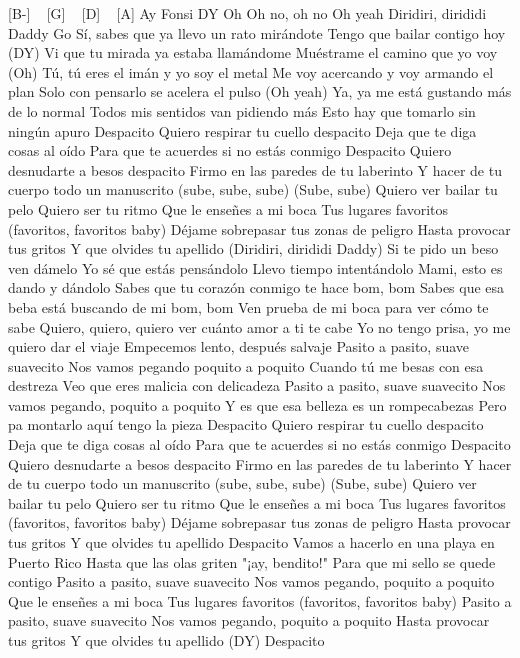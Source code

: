 
[B-] ~ [G] ~ [D] ~ [A]
Ay
Fonsi
DY
Oh
Oh no, oh no
Oh yeah
Diridiri, dirididi Daddy
Go
Sí, sabes que ya llevo un rato mirándote
Tengo que bailar contigo hoy (DY)
Vi que tu mirada ya estaba llamándome
Muéstrame el camino que yo voy (Oh)
Tú, tú eres el imán y yo soy el metal
Me voy acercando y voy armando el plan
Solo con pensarlo se acelera el pulso (Oh yeah)
Ya, ya me está gustando más de lo normal
Todos mis sentidos van pidiendo más
Esto hay que tomarlo sin ningún apuro
Despacito
Quiero respirar tu cuello despacito
Deja que te diga cosas al oído
Para que te acuerdes si no estás conmigo
Despacito
Quiero desnudarte a besos despacito
Firmo en las paredes de tu laberinto
Y hacer de tu cuerpo todo un manuscrito (sube, sube, sube)
(Sube, sube)
Quiero ver bailar tu pelo
Quiero ser tu ritmo
Que le enseñes a mi boca
Tus lugares favoritos (favoritos, favoritos baby)
Déjame sobrepasar tus zonas de peligro
Hasta provocar tus gritos
Y que olvides tu apellido (Diridiri, dirididi Daddy)
Si te pido un beso ven dámelo
Yo sé que estás pensándolo
Llevo tiempo intentándolo
Mami, esto es dando y dándolo
Sabes que tu corazón conmigo te hace bom, bom
Sabes que esa beba está buscando de mi bom, bom
Ven prueba de mi boca para ver cómo te sabe
Quiero, quiero, quiero ver cuánto amor a ti te cabe
Yo no tengo prisa, yo me quiero dar el viaje
Empecemos lento, después salvaje
Pasito a pasito, suave suavecito
Nos vamos pegando poquito a poquito
Cuando tú me besas con esa destreza
Veo que eres malicia con delicadeza
Pasito a pasito, suave suavecito
Nos vamos pegando, poquito a poquito
Y es que esa belleza es un rompecabezas
Pero pa montarlo aquí tengo la pieza
Despacito
Quiero respirar tu cuello despacito
Deja que te diga cosas al oído
Para que te acuerdes si no estás conmigo
Despacito
Quiero desnudarte a besos despacito
Firmo en las paredes de tu laberinto
Y hacer de tu cuerpo todo un manuscrito (sube, sube, sube)
(Sube, sube)
Quiero ver bailar tu pelo
Quiero ser tu ritmo
Que le enseñes a mi boca
Tus lugares favoritos (favoritos, favoritos baby)
Déjame sobrepasar tus zonas de peligro
Hasta provocar tus gritos
Y que olvides tu apellido
Despacito
Vamos a hacerlo en una playa en Puerto Rico
Hasta que las olas griten "¡ay, bendito!"
Para que mi sello se quede contigo
Pasito a pasito, suave suavecito
Nos vamos pegando, poquito a poquito
Que le enseñes a mi boca
Tus lugares favoritos (favoritos, favoritos baby)
Pasito a pasito, suave suavecito
Nos vamos pegando, poquito a poquito
Hasta provocar tus gritos
Y que olvides tu apellido (DY)
Despacito
